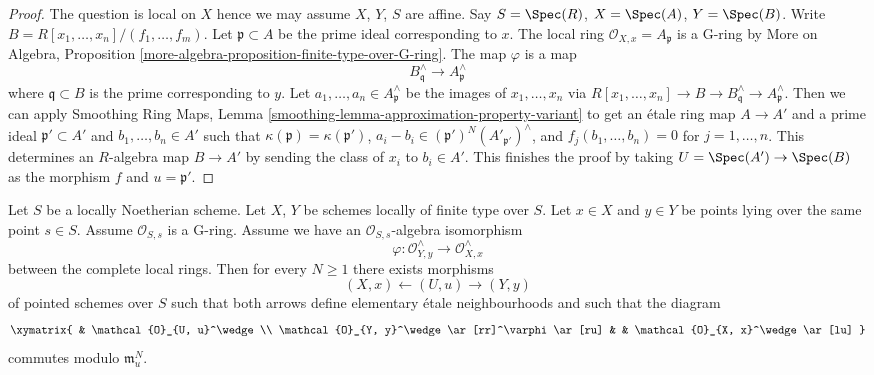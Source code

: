 \begin{proof}
The question is local on $X$ hence we may assume $X$, $Y$, $S$ are affine.
Say $S = \Spec(R)$, $X = \Spec(A)$, $Y = \Spec(B)$.
Write $B = R[x_1, \ldots, x_n]/(f_1, \ldots, f_m)$.
Let $\mathfrak p \subset A$ be the prime ideal corresponding to $x$.
The local ring $\mathcal{O}_{X, x} = A_\mathfrak p$ is a G-ring by
More on Algebra, Proposition
\ref{more-algebra-proposition-finite-type-over-G-ring}.
The map $\varphi$ is a map
$$
B_\mathfrak q^\wedge \longrightarrow A_\mathfrak p^\wedge
$$
where $\mathfrak q \subset B$ is the prime corresponding to $y$.
Let $a_1, \ldots, a_n \in A_\mathfrak p^\wedge$ be the images
of $x_1, \ldots, x_n$ via
$R[x_1, \ldots, x_n] \to B \to B_\mathfrak q^\wedge \to A_\mathfrak p^\wedge$.
Then we can apply Smoothing Ring Maps, Lemma
\ref{smoothing-lemma-approximation-property-variant}
to get an \'etale ring map $A \to A'$ and a prime ideal
$\mathfrak p' \subset A'$ and $b_1, \ldots, b_n \in A'$ such that
$\kappa(\mathfrak p) = \kappa(\mathfrak p')$,
$a_i - b_i \in (\mathfrak p')^N(A'_{\mathfrak p'})^\wedge$, and
$f_j(b_1, \ldots, b_n) = 0$ for $j = 1, \ldots, n$.
This determines an $R$-algebra map $B \to A'$ by sending the
class of $x_i$ to $b_i \in A'$. This finishes the proof
by taking $U = \Spec(A') \to \Spec(B)$ as the morphism $f$
and $u = \mathfrak p'$.
\end{proof}

\begin{lemma}
\label{lemma-isomorphism-approximation}
Let $S$ be a locally Noetherian scheme. Let $X$, $Y$ be
schemes locally of finite
type over $S$. Let $x \in X$ and $y \in Y$ be points lying over the
same point $s \in S$. Assume $\mathcal{O}_{S, s}$ is a G-ring.
Assume we have an $\mathcal{O}_{S, s}$-algebra isomorphism
$$
\varphi : \mathcal{O}_{Y, y}^\wedge \longrightarrow \mathcal{O}_{X, x}^\wedge
$$
between the complete local rings. Then for every $N \geq 1$
there exists morphisms
$$
(X, x) \leftarrow (U, u) \rightarrow (Y, y)
$$
of pointed schemes over $S$ such that both arrows define elementary
\'etale neighbourhoods and such that the diagram
$$
\xymatrix{
& \mathcal{O}_{U, u}^\wedge \\
\mathcal{O}_{Y, y}^\wedge \ar[rr]^\varphi \ar[ru] & &
\mathcal{O}_{X, x}^\wedge \ar[lu]
}
$$
commutes modulo $\mathfrak m_u^N$.
\end{lemma}

